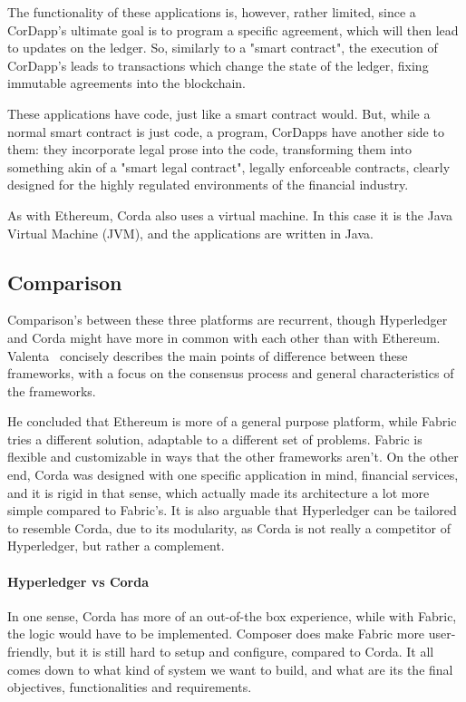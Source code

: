 The functionality of these applications is, however, rather limited, since a CorDapp's ultimate goal is to program a specific agreement, which will then lead to updates on the ledger. So, similarly to a "smart contract", the execution of CorDapp's leads to transactions which change the state of the ledger, fixing immutable agreements into the blockchain.

These applications have code, just like a smart contract would. But, while a normal smart contract is just code, a program, CorDapps have another side to them: they incorporate legal prose into the code, transforming them into something akin of a "smart legal contract", legally enforceable contracts, clearly designed for the highly regulated environments of the financial industry.

As with Ethereum, Corda also uses a virtual machine. In this case it is the Java Virtual Machine (JVM), and the applications are written in Java.


\subsection{Comparison}
Comparison's between these three platforms are recurrent, though Hyperledger and Corda might have more in common with each other than with Ethereum. 
Valenta~\cite{Valenta2017} concisely describes the main points of difference between these frameworks, with a focus on the consensus process and general characteristics of the frameworks. 

He concluded that Ethereum is more of a general purpose platform, while Fabric tries a different solution, adaptable to a different set of problems. Fabric is flexible and customizable in ways that the other frameworks aren't. On the other end, Corda  was designed with one specific application in mind, financial services, and it is rigid in that sense, which actually made its architecture a lot more simple compared to Fabric's. It is also arguable that Hyperledger can be tailored to resemble Corda, due to its modularity, as Corda is not really a competitor of Hyperledger, but rather a complement. 

\paragraph{Hyperledger vs Corda} In one sense, Corda has more of an out-of-the box experience, while with Fabric, the logic would have to be implemented. Composer does make Fabric more user-friendly, but it is still hard to setup and configure, compared to Corda. It all comes down to what kind of system we want to build, and what are its the final objectives, functionalities and requirements.

